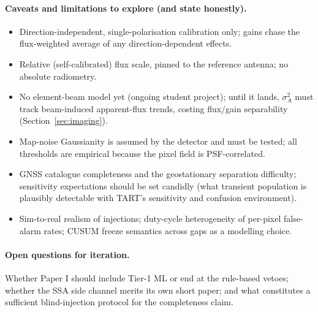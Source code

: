 \documentclass[11pt]{article}
\begin{document}
\paragraph{Caveats and limitations to explore (and state honestly).}
\begin{itemize}[leftmargin=*]
  \item Direction-independent, single-polarisation calibration only; gains chase the flux-weighted
        average of any direction-dependent effects.
  \item Relative (self-calibrated) flux scale, pinned to the reference antenna; no absolute
        radiometry.
  \item No element-beam model yet (ongoing student project); until it lands, $\sigma_A^2$ must
        track beam-induced apparent-flux trends, costing flux/gain separability
        (Section~\ref{sec:imaging}).
  \item Map-noise Gaussianity is assumed by the detector and must be tested; all thresholds are
        empirical because the pixel field is PSF-correlated.
  \item GNSS catalogue completeness and the geostationary separation difficulty; sensitivity
        expectations should be set candidly (what transient population is plausibly detectable
        with TART's sensitivity and confusion environment).
  \item Sim-to-real realism of injections; duty-cycle heterogeneity of per-pixel false-alarm
        rates; CUSUM freeze semantics across gaps as a modelling choice.
\end{itemize}

\paragraph{Open questions for iteration.} Whether Paper I should include Tier-1 ML or end at the
rule-based vetoes; whether the SSA side channel merits its own short paper; and what constitutes a
sufficient blind-injection protocol for the completeness claim.
\end{document}
